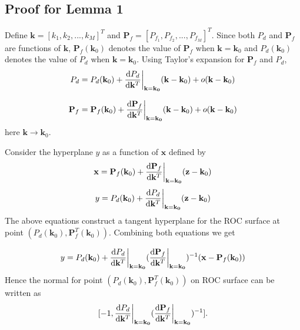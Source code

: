 \documentclass[12pt,journal,a4paper,twoside,doublecolumn]{IEEEtran}
\begin{document}
\begin{spacing}{1.0}
\appendix
\subsection{Proof for Lemma 1}

Define $\mathbf{k} = [k_1, k_2, ..., k_M]^T$ and $\mathbf{P}_f = [P_{f_1}, P_{f_2}, ..., P_{f_M}]^T$. Since both $P_d$ and $\mathbf{P}_f$ are functions of $\mathbf{k}$, $\mathbf{P}_f(\mathbf{k}_0)$ denotes the value of $\mathbf{P}_f$ when $\mathbf{k} = \mathbf{k}_0$ and $P_d(\mathbf{k}_0)$ denotes the value of $P_d$ when $\mathbf{k} = \mathbf{k}_0$. Using Taylor's expansion for $\mathbf{P}_f$ and $P_d$,
\begin{equation}
\label{pro: pd}
P_d = P_d(\mathbf{k}_0) + \frac{\mathrm{d}P_d}{\mathrm{d}\mathbf{k}^T}\bigg{|}_{\mathbf{k}=\mathbf{k_0}}(\mathbf{k} - \mathbf{k}_0)
+ o(\mathbf{k} - \mathbf{k}_0)
\end{equation}

\begin{equation}
\label{pro: pf}
\mathbf{P}_f = \mathbf{P}_f(\mathbf{k}_0) + \frac{\mathrm{d}\mathbf{P}_f}{\mathrm{d}\mathbf{k}^T}\bigg{|}_{\mathbf{k}=\mathbf{k_0}}(\mathbf{k} - \mathbf{k}_0)
+ o(\mathbf{k} - \mathbf{k}_0)
\end{equation}
here $\mathbf{k} \rightarrow \mathbf{k}_0$.

Consider the hyperplane $y$ as a function of $\mathbf{x}$ defined by
\begin{equation}
\label{pro: x}
\mathbf{x} = \mathbf{P}_f(\mathbf{k}_0) + \frac{\mathrm{d}\mathbf{P}_f}{\mathrm{d}\mathbf{k}^T}\bigg{|}_{\mathbf{k}=\mathbf{k_0}}(\mathbf{z} - \mathbf{k}_0)
\end{equation}
\begin{equation}
\label{pro: y}
y = P_d(\mathbf{k}_0) + \frac{\mathrm{d}P_d}{\mathrm{d}\mathbf{k}^T}\bigg{|}_{\mathbf{k}=\mathbf{k_0}}(\mathbf{z} - \mathbf{k}_0)
\end{equation}
The above equations construct a tangent hyperplane for the ROC surface at point $(P_d(\mathbf{k}_0), \mathbf{P}_f^T(\mathbf{k}_0))$. Combining both equations  we get

\begin{equation}
\label{pro : y2}
y = P_d(\mathbf{k}_0) + \frac{\mathrm{d}P_d}{\mathrm{d}\mathbf{k}^T}\bigg{|}_{\mathbf{k}=\mathbf{k_0}}(
\frac{\mathrm{d}\mathbf{P}_f}{\mathrm{d}\mathbf{k}^T}\bigg{|}_{\mathbf{k}=\mathbf{k_0}}
)^{-1} (\mathbf{x} - \mathbf{P}_f(\mathbf{k}_0))
\end{equation}
Hence the normal for point $(P_d(\mathbf{k}_0), \mathbf{P}_f^T(\mathbf{k}_0))$ on ROC surface can be written as
\begin{equation}
\label{vec: normal}
[-1, \frac{\mathrm{d}P_d}{\mathrm{d}\mathbf{k}^T}\bigg{|}_{\mathbf{k}=\mathbf{k_0}}(
\frac{\mathrm{d}\mathbf{P}_f}{\mathrm{d}\mathbf{k}^T}\bigg{|}_{\mathbf{k}=\mathbf{k_0}}
)^{-1}
].
\end{equation}


\end{spacing}
\end{document}
